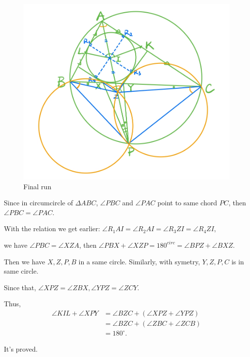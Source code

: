 \documentclass{Math_Note}
\begin{document}
\begin{sol}
\begin{figure}[H]
    \centering
    \includegraphics[scale=0.25]{"./Figures/Q4F3.png"}
    \caption{Final run}
\end{figure}

Since in circumcircle of $\Delta ABC$, $\angle PBC$ and $\angle PAC$ point to same chord $PC$, then $\angle PBC=\angle PAC$. 

With the relation we get earlier: $\angle R_{1}AI=\angle R_{2}AI=\angle R_{3}ZI=\angle R_{4}ZI$, 

we have $\angle PBC=\angle XZA$, then $\angle PBX+\angle XZP=180^{circ}=\angle BPZ+\angle BXZ$. 

Then we have $X,Z,P,B$ in a same circle. Similarly, with symetry, $Y,Z,P,C$ is in same circle. 

Since that, $\angle XPZ=\angle ZBX, \angle YPZ=\angle ZCY$. 

Thus,
\begin{equation}
    \begin{split}
        \angle KIL+\angle XPY &= \angle BZC+\left(\angle XPZ+\angle YPZ\right)\\
        &= \angle BZC+\left(\angle ZBC+\angle ZCB\right) \\
        &= 180^{\circ}. 
    \end{split}
\end{equation}

It's proved.

\end{sol}
\end{document}
